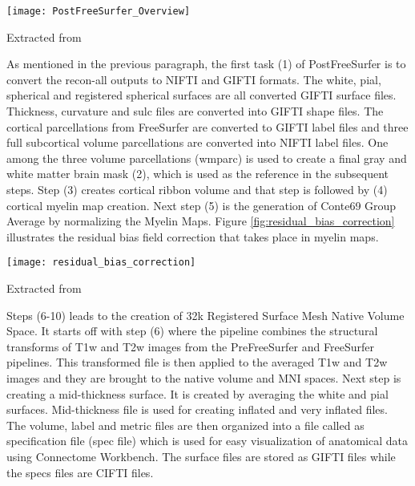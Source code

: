 \begin{center}
  \texttt{[image: PostFreeSurfer\_Overview]}
  \label{fig:postfreesurfer_overview}
  \caption*{Extracted from \cite{Gla13}}
\end{center}

As mentioned in the previous paragraph, the first task (1) of PostFreeSurfer is to convert the recon-all outputs to NIFTI and GIFTI formats. The white, pial, spherical and registered spherical surfaces are all converted GIFTI surface files. Thickness, curvature and sulc files are converted into GIFTI shape files. The cortical parcellations from FreeSurfer are converted to GIFTI label files and three full subcortical volume parcellations are converted into NIFTI label files. One among the three volume parcellations (wmparc) is used to create a final gray and white matter brain mask (2), which is used as the reference in the subsequent steps. Step (3) creates cortical ribbon volume and that step is followed by (4) cortical myelin map creation. Next step (5) is the generation of Conte69 Group Average by normalizing the Myelin Maps. Figure \ref{fig:residual_bias_correction} illustrates the residual bias field correction that takes place in myelin maps.

\vspace{0.2cm}%
\begin{center}
  \texttt{[image: residual\_bias\_correction]}
  \label{fig:residual_bias_correction}
  \caption*{Extracted from \cite{Gla13}}
\end{center}

Steps (6-10) leads to the creation of 32k Registered Surface Mesh Native Volume Space. It starts off with step (6) where the pipeline combines the structural transforms of T1w and T2w images from the PreFreeSurfer and FreeSurfer pipelines. This transformed file is then applied to the averaged T1w and T2w images and they are brought to the native volume and MNI spaces. Next step is creating a mid-thickness surface. It is created by averaging the white and pial surfaces. Mid-thickness file is used for creating inflated and very inflated files. The volume, label and metric files are then organized into a file called as specification file (spec file) which is used for easy visualization of anatomical data using Connectome Workbench. The surface files are stored as GIFTI files while the specs files are CIFTI files.

